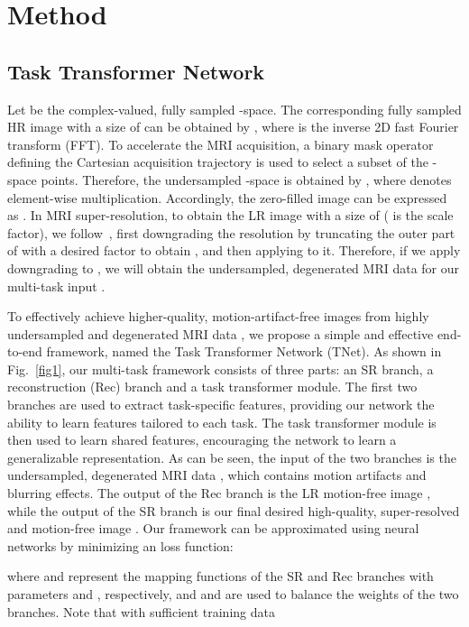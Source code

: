 \documentclass[runningheads]{llncs}
\newcommand{\figref}[1]{Fig.\!~\ref{#1}}
\begin{document}
\section{Method}
\subsection{Task Transformer Network}
Let  be the complex-valued, fully sampled -space. The corresponding fully sampled HR image with a size of  can be obtained by , where  is the inverse 2D fast Fourier transform (FFT). To accelerate the MRI acquisition, a binary mask operator  defining the Cartesian acquisition trajectory is used to select a subset of the -space points. Therefore, the undersampled -space is obtained by , where  denotes element-wise multiplication. Accordingly, the zero-filled image can be  expressed as . In MRI super-resolution, to obtain the LR image  with a size of  ( is the scale factor), we follow~\cite{chen2018efficient}, first downgrading the resolution by truncating the outer part of  with a desired factor to obtain , and then applying  to it. Therefore, if we apply downgrading to , we will obtain the undersampled, degenerated MRI data for our multi-task input .









To effectively achieve higher-quality, motion-artifact-free images from highly undersampled and degenerated MRI data , we propose a simple and effective end-to-end framework, named the Task Transformer Network (TNet). As shown in \figref{fig1}, our multi-task framework consists of three parts: an SR branch, a reconstruction (Rec) branch and a task transformer module. The first two branches are used to extract task-specific features, providing our network the ability to learn features tailored to each task. The task transformer module is then used to learn shared features, encouraging the network to learn a generalizable representation. As can be seen, the input of the two branches is the undersampled, degenerated MRI data , which contains motion artifacts and blurring effects. The output of the Rec branch is the LR motion-free image , while the output of the SR branch is our final desired high-quality, super-resolved and motion-free image . Our framework can be approximated using neural networks by minimizing an  loss function:

where  and  represent the mapping functions of the SR and Rec branches with parameters  and , respectively, and  and  are used to balance the weights of the two branches. Note that with sufficient training data
\end{document}
